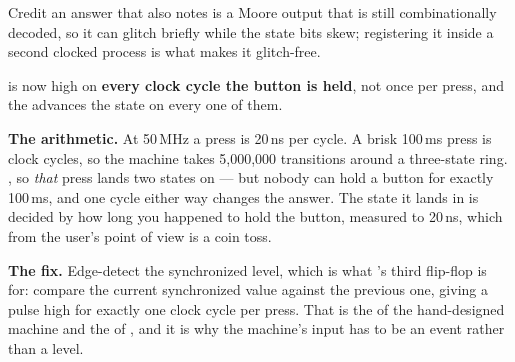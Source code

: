 Credit an answer that also notes  is a Moore output that
is still combinationally decoded, so it can glitch briefly while the state bits skew; registering it
inside a second clocked process is what makes it glitch-free.

 is now high on \textbf{every clock cycle the button is held}, not once per
press, and the  advances the state on every one of them.

\textbf{The arithmetic.} At 50\,MHz a press is 20\,ns per cycle. A brisk 100\,ms press is
 clock cycles, so the machine takes 5,000,000 transitions around a
three-state ring. , so \emph{that} press lands two states on --- but
nobody can hold a button for exactly 100\,ms, and one cycle either way changes the answer. The state
it lands in is decided by how long you happened to hold the button, measured to 20\,ns, which from
the user's point of view is a coin toss. 

\textbf{The fix.} Edge-detect the synchronized level, which is what 's third
flip-flop is for: compare the current synchronized value against the previous one, giving a pulse
high for exactly one clock cycle per press. That is the  of the hand-designed machine and the
 of , and it is why the machine's input has to be an event rather
than a level. 
